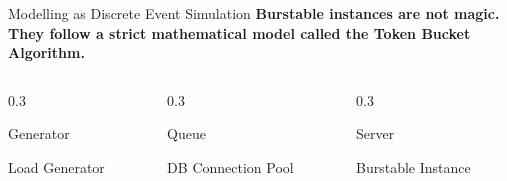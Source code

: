 \documentclass[11pt, aspectratio=169]{beamer}
\begin{document}
\begin{frame}{Modelling as Discrete Event Simulation}
    \textbf{Burstable instances are not magic. They follow a strict mathematical model called the Token Bucket Algorithm.}
    \vfill
    \begin{columns}[t]
        \begin{column}{0.3\textwidth}
            \begin{block}{Generator}
                \begin{center}
                    {\small Load Generator}
                \end{center}
            \end{block}
        \end{column}
        \begin{column}{0.3\textwidth}
            \begin{block}{Queue}
                \begin{center}
                    {\small DB Connection Pool}
                \end{center}
            \end{block}
        \end{column}
        \begin{column}{0.3\textwidth}
            \begin{block}{Server}
                \begin{center}
                    {\small Burstable Instance}
                \end{center}
            \end{block}
        \end{column}
    \end{columns}
\end{frame}
\end{document}

